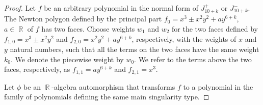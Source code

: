 \documentclass[noend]{amsproc}
\theoremstyle{definition}
\DeclareMathOperator{\R}{\mathbb{R}}
\begin{document}
\begin{proof}
Let $f$ be an arbitrary polynomial in the normal form of $J_{10+k}^+$ or $J_{10+k}^-$. 
The Newton polygon defined by the principal part $f_0=x^3\pm x^2y^2+ay^{6+k}$, $a\in\R$ of $f$ has two faces. Choose weights $w_1$ and $w_2$ for the two faces defined by $f_{1,0}=x^3\pm x^2y^2$ and $f_{2,0}=x^2y^2+ay^{6+k}$, respectively, with the weights of $x$ and $y$ natural numbers, such that all the terms on the two faces have the same weight $k_0$. We denote the piecewise weight by $w_0$. We refer to the terms above the two faces, respectively, as $f_{1,1}=ay^{6+k}$ and $f_{2,1}=x^3$.

Let $\phi$ be an $\R$-algebra automorphism that transforms $f$ to a polynomial in the family of polynomials defining the same main singularity type.


\end{proof}
\end{document}

